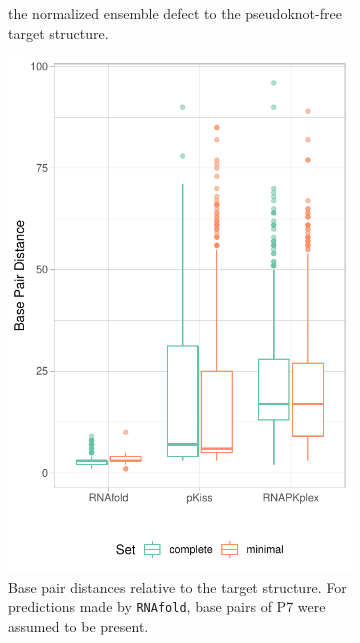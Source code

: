 \documentclass[../../master.tex]{subfiles}
\begin{document}
\begin{figure}[!ht]
\begin{subfigure}[t]{0.2\textwidth}
		\caption{the normalized ensemble defect to the pseudoknot-free target structure.
		}\label{fig:stats_constrained:b}
	\end{subfigure}%
	\begin{subfigure}[t]{0.27\textwidth}
		\centering
		\includegraphics[width=\textwidth]{pic/results/designs/boxplots/const-bp-boxplot.pdf}
		\caption{Base pair distances relative to the target structure. For predictions made by \texttt{RNAfold}, base pairs of P7 were assumed to be present.
		}\label{fig:stats_constrained:c}
	\end{subfigure}
	\begin{subfigure}[t]{0.27\textwidth}
		\centering

\end{subfigure}
\end{figure}
\end{document}
